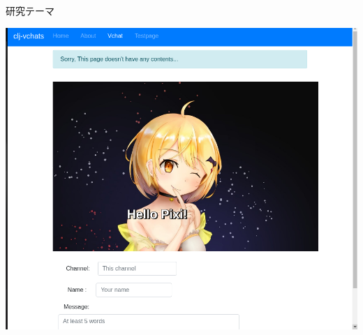 \documentclass[dvipdfmx,10pt,presentation]{beamer}
\begin{document}
\begin{frame}[allowframebreaks]{研究テーマ}
\begin{block}{}
\begin{center}
\includegraphics[width=0.7\linewidth]{./screen2.png}
\end{center}
\end{block}
\end{frame}
\end{document}
